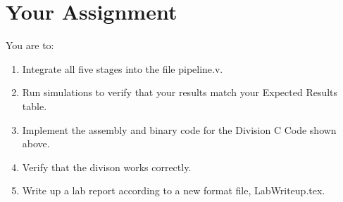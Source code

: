 \section{Your Assignment}

You are to:
\begin{enumerate}
\item Integrate all five stages into the file pipeline.v.
\item Run simulations to verify that your results match your Expected Results table.   
\item Implement the assembly and binary code for the Division C Code shown above.
\item Verify that the divison works correctly.
\item Write up a lab report according to a new format file, LabWriteup.tex.
\end{enumerate} 
